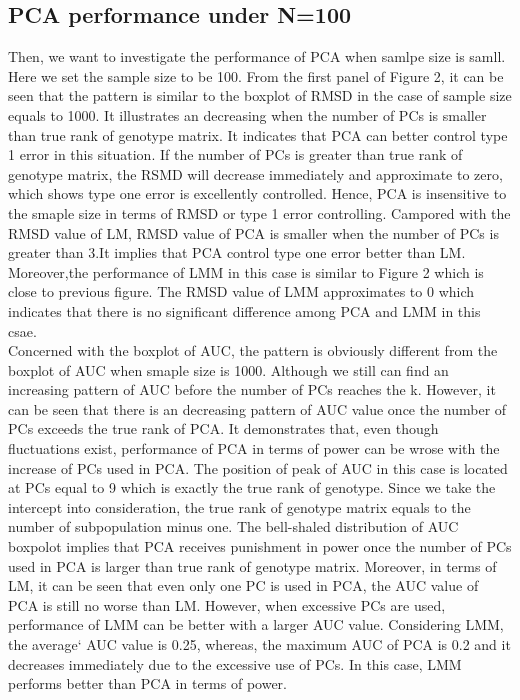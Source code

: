 \documentclass[12pt]{article}
\begin{document}
\subsection{PCA performance under N=100}

Then, we want to investigate the performance of PCA when samlpe size is samll. Here we set the sample size to be 100. From the first panel of Figure 2, it can be seen that the pattern is similar to the boxplot of RMSD in the case of sample size equals to 1000. It illustrates an decreasing when the number of PCs is smaller than true rank of genotype matrix. It indicates that PCA can better control type 1 error in this situation. If the number of PCs is greater than true rank of genotype matrix, the RSMD will decrease immediately and approximate to zero, which shows type one error is excellently controlled. Hence, PCA is insensitive to the smaple size in terms of RMSD or type 1 error controlling. Campored with the RMSD value of LM, RMSD value of PCA is smaller when the number of PCs is greater than 3.It implies that PCA control type one error better than LM. Moreover,the performance of LMM in this case is similar to Figure 2 which is close to previous figure. The RMSD value of LMM approximates to 0 which indicates that there is no significant difference among PCA and LMM in this csae.\\

Concerned with the boxplot of AUC, the pattern is obviously different from the boxplot of AUC when smaple size is 1000. Although we still can find an increasing pattern of AUC before the number of PCs reaches the k. However, it can be seen that there is an decreasing pattern of AUC value once the number of PCs exceeds the true rank of PCA. It demonstrates that, even though fluctuations exist, performance of PCA in terms of power can be wrose with the increase of PCs used in PCA. The position of peak of AUC in this case is located at PCs equal to 9 which is exactly the true rank of genotype. Since we take the intercept into consideration, the true rank of genotype matrix equals to the number of subpopulation minus one. The bell-shaled distribution of AUC boxpolot implies that PCA receives punishment in power once the number of PCs used in PCA is larger than true rank of genotype matrix. Moreover, in terms of LM, it can be seen that even only one PC is used in PCA, the AUC value of PCA is still no worse than LM. However, when  excessive PCs are used, performance of LMM can be better with a larger AUC value. Considering LMM, the average` AUC value is 0.25, whereas, the maximum AUC of PCA is 0.2 and it decreases immediately due to the excessive use of PCs. In this case, LMM performs better than PCA in terms of power. \\
\end{document}
